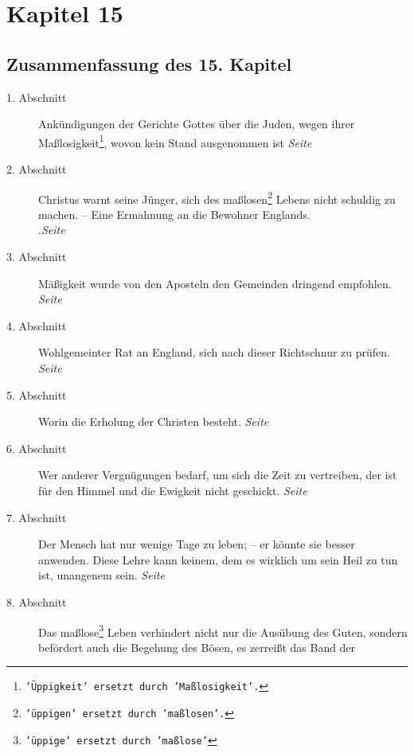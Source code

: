 
\chapter{Kapitel 15} \label{kap15}

\section{Zusammenfassung des 15. Kapitel}

\begin{description}
\item[1. Abschnitt] Ankündigungen der Gerichte Gottes über die Juden, wegen
ihrer Maßlosigkeit\footnote{\texttt{'Üppigkeit' ersetzt durch 'Maßlosigkeit'.}},
wovon
kein Stand ausgenommen ist
\dotfill \textit{Seite~\pageref{kap15_ab1}}\\
\item[2. Abschnitt] Christus warnt seine Jünger, sich des
maßlosen\footnote{\texttt{'üppigen' ersetzt durch 'maßlosen'.}} Lebens nicht
schuldig zu machen. -- Eine Ermahnung an die Bewohner Englands.\\
.\dotfill \textit{Seite~\pageref{kap15_ab2}}\\
\item[3. Abschnitt] Mäßigkeit wurde von den Aposteln den Gemeinden dringend
empfohlen.
\dotfill \textit{Seite~\pageref{kap15_ab3}}\\
\item[4. Abschnitt] Wohlgemeinter Rat an England, sich nach dieser Richtschnur
zu prüfen.
\dotfill \textit{Seite~\pageref{kap15_ab4}}\\
\item[5. Abschnitt] Worin die Erholung der Christen besteht.
\dotfill \textit{Seite~\pageref{kap15_ab5}}\\
\item[6. Abschnitt] Wer anderer Vergnügungen bedarf, um sich die Zeit zu
vertreiben, der ist für den Himmel und die Ewigkeit nicht geschickt.
\dotfill \textit{Seite~\pageref{kap15_ab6}}\\
\item[7. Abschnitt] Der Mensch hat nur wenige Tage zu leben; -- er könnte sie
besser anwenden. Diese Lehre kann keinem, dem es wirklich um sein Heil zu tun
ist, unangenem sein.
\dotfill \textit{Seite~\pageref{kap15_ab6}}\\
\item[8. Abschnitt] Das maßlose\footnote{\texttt{'üppige' ersetzt durch
'maßlose'}}
Leben verhindert nicht nur die Ausübung des
Guten, sondern befördert auch die Begehung des Bösen, es zerreißt das Band der

\end{description}
